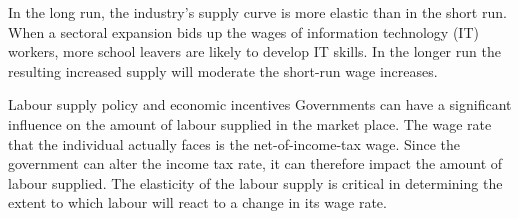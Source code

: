 In the long run, the industry's supply curve is more elastic than in the short run. When a sectoral expansion bids up the wages of information technology (IT) workers, more school leavers are likely to develop IT skills. In the longer run the resulting increased supply will moderate the short-run wage increases.

\begin{ApplicationBox}{Labour supply policy and economic incentives \label{app:laboursupplypolicy}}
Governments can have a significant influence on the amount of labour supplied in the market place. The wage rate that the individual actually faces is the net-of-income-tax wage. Since the government can alter the income tax rate, it can therefore impact the amount of labour supplied. The elasticity of the labour supply is critical in determining the extent to which labour will react to a change in its wage rate. 
\end{ApplicationBox}